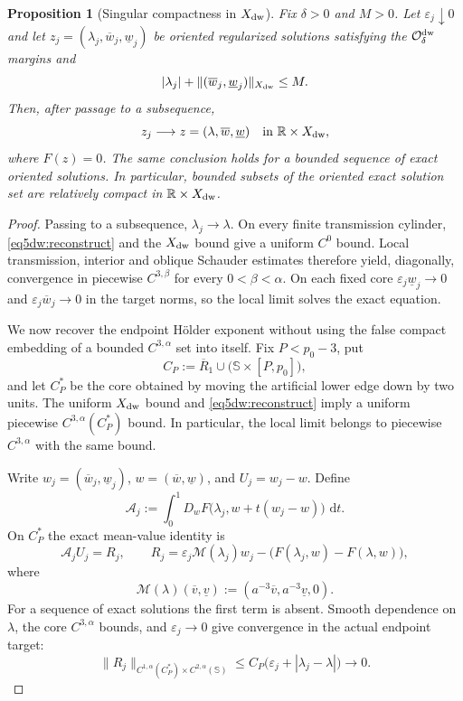 \documentclass[11pt,reqno]{amsart}
\numberwithin{equation}{section}
\newtheorem{proposition}[theorem]{Proposition}
\newcommand{\dd}{\,\mathrm{d}}
\theoremstyle{definition}
\theoremstyle{remark}
\begin{document}
\begin{proposition}[Singular compactness in $X_{\rm dw}$]
\label{lem5.5-uniform}
Fix $\delta>0$ and $M>0$.  Let $\varepsilon_j\downarrow0$ and let
$z_j=(\lambda_j,\overline w_j,\underline w_j)$ be oriented regularized
solutions satisfying the $\mathcal O_\delta^{\rm dw}$ margins and
\[
 |\lambda_j|+\|(\overline w_j,\underline w_j)\|_{X_{\rm dw}}\le M.
\]
Then, after passage to a subsequence,
\[
 z_j\longrightarrow z=(\lambda,\overline w,\underline w)
 \quad\text{in }\mathbb R\times X_{\rm dw},
\]
where $F(z)=0$.  The same conclusion holds for a bounded sequence of
exact oriented solutions.  In particular, bounded subsets of the
oriented exact solution set are relatively compact in
$\mathbb R\times X_{\rm dw}$.
\end{proposition}
\begin{proof}
Passing to a subsequence, $\lambda_j\to\lambda$.  On every finite
transmission cylinder, \eqref{eq5dw:reconstruct} and the
$X_{\rm dw}$ bound give a uniform $C^0$ bound.  Local transmission,
interior and oblique Schauder estimates therefore yield, diagonally,
convergence in piecewise $C^{3,\beta}$ for every $0<\beta<\alpha$.
On each fixed core $\varepsilon_j\underline w_j\to0$ and
$\varepsilon_j\overline w_j\to0$ in the target norms, so the local
limit solves the exact equation.

We now recover the endpoint H\"older exponent without using the false
compact embedding of a bounded $C^{3,\alpha}$ set into itself.  Fix
$P<p_0-3$, put
\[
 C_P:=\overline R_1\cup
  \bigl(\mathbb S\times[P,p_0]\bigr),
\]
and let $C_P^*$ be the core obtained by moving the artificial lower
edge down by two units.  The uniform $X_{\rm dw}$ bound and
\eqref{eq5dw:reconstruct} imply a uniform piecewise
$C^{3,\alpha}(C_P^*)$ bound.  In particular, the local limit belongs
to piecewise $C^{3,\alpha}$ with the same bound.

Write $w_j=(\overline w_j,\underline w_j)$,
$w=(\overline w,\underline w)$, and $U_j=w_j-w$.  Define
\[
 \mathscr A_j:=\int_0^1D_wF
 \bigl(\lambda_j,w+t(w_j-w)\bigr)\,\dd t.
\]
On $C_P^*$ the exact mean-value identity is
\begin{equation}\label{eq:endpoint-difference-equation}
 \mathscr A_jU_j=R_j,
 \qquad
 R_j=\varepsilon_j\mathcal M(\lambda_j)w_j
 -\bigl(F(\lambda_j,w)-F(\lambda,w)\bigr),
\end{equation}
where
\[
 \mathcal M(\lambda)(\overline v,\underline v)
 :=(a^{-3}\overline v,a^{-3}\underline v,0).
\]
For a sequence of exact solutions the first term is absent.  Smooth
dependence on $\lambda$, the core $C^{3,\alpha}$ bounds, and
$\varepsilon_j\to0$ give convergence in the actual endpoint target:
\begin{equation}\label{eq:endpoint-residual-convergence}
 \|R_j\|_{C^{1,\alpha}(C_P^*)\times
 C^{2,\alpha}(\mathbb S)}
 \le C_P\bigl(\varepsilon_j+|\lambda_j-\lambda|\bigr)
 \longrightarrow0.
\end{equation}


\end{proof}
\end{document}

